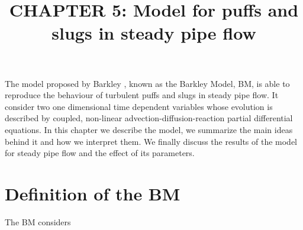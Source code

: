 \documentclass{article}
\title{CHAPTER 5: Model for puffs and slugs in steady pipe flow}
\date{}
\begin{document}
\maketitle
The model proposed by Barkley \cite{barkley2011modeling}, known as the Barkley Model, BM, is able to reproduce the behaviour of turbulent puffs and slugs in steady pipe flow. It consider two one dimensional time dependent variables whose evolution is described by coupled, non-linear advection-diffusion-reaction partial differential equations. In this chapter we describe the model, we summarize the main ideas behind it and how we interpret them. We finally discuss the results of the model for steady pipe flow and the effect of its parameters. 



\section{Definition of the BM}
The BM considers 
















\end{document}
